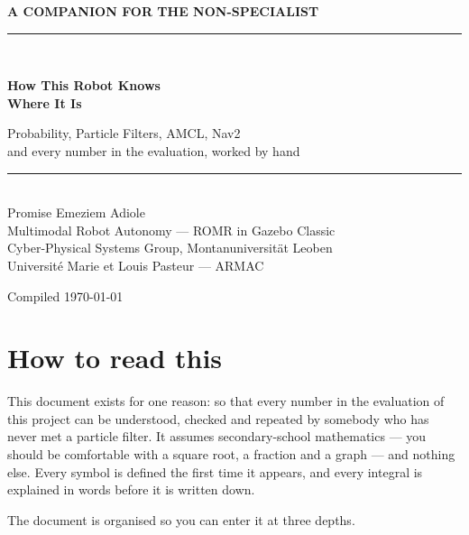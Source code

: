 \documentclass[11pt,a4paper]{report}
\begin{document}
\begin{titlepage}
\thispagestyle{empty}
\centering
\vspace*{2.2cm}
{\color{amber}\large\bfseries A COMPANION FOR THE NON-SPECIALIST}\\[2mm]
{\color{rule}\rule{0.35\textwidth}{0.8pt}}\\[14mm]
{\color{ink}\Huge\bfseries How This Robot Knows\\[4mm] Where It Is\par}
\vspace{10mm}
{\color{slate}\Large Probability, Particle Filters, AMCL, Nav2\\[2mm]
and every number in the evaluation, worked by hand\par}
\vspace{16mm}
{\color{rule}\rule{0.55\textwidth}{0.5pt}}\\[6mm]
{\large Promise Emeziem Adiole}\\[2mm]
{\color{slate}Multimodal Robot Autonomy --- ROMR in Gazebo Classic}\\[1mm]
{\color{slate}\small Cyber-Physical Systems Group, Montanuniversit\"at Leoben}\\[1mm]
{\color{slate}\small Universit\'e Marie et Louis Pasteur --- ARMAC}\\
\vfill
{\color{slate}\small Compiled \today\par}
\end{titlepage}

\chapter*{How to read this}

This document exists for one reason: so that every number in the evaluation
of this project can be understood, checked and repeated by somebody who has
never met a particle filter. It assumes secondary-school mathematics --- you
should be comfortable with a square root, a fraction and a graph --- and
nothing else. Every symbol is defined the first time it appears, and every
integral is explained in words before it is written down.

The document is organised so you can enter it at three depths.
\end{document}
